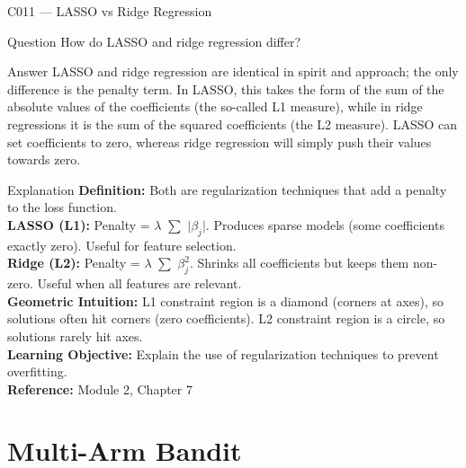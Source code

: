 \documentclass[aspectratio=169,8pt]{beamer}
\begin{document}
	\begin{frame}{C011 --- LASSO vs Ridge Regression}
		\begin{block}{Question}
			How do LASSO and ridge regression differ?
		\end{block}
		\begin{block}{Answer}
			LASSO and ridge regression are identical in spirit and approach; the only difference is the penalty term. In LASSO, this takes the form of the sum of the absolute values of the coefficients (the so-called L1 measure), while in ridge regressions it is the sum of the squared coefficients (the L2 measure). LASSO can set coefficients to zero, whereas ridge regression will simply push their values towards zero.
		\end{block}
		\begin{block}{Explanation}
			\textbf{Definition:} Both are regularization techniques that add a penalty to the loss function.\\
			\textbf{LASSO (L1):} Penalty = $\lambda$ $\sum$ $|$$\beta_j$$|$. Produces sparse models (some coefficients exactly zero). Useful for feature selection.\\
			\textbf{Ridge (L2):} Penalty = $\lambda$ $\sum$ $\beta_j^2$. Shrinks all coefficients but keeps them non-zero. Useful when all features are relevant.\\
			\textbf{Geometric Intuition:} L1 constraint region is a diamond (corners at axes), so solutions often hit corners (zero coefficients). L2 constraint region is a circle, so solutions rarely hit axes.\\
			\textbf{Learning Objective:} Explain the use of regularization techniques to prevent overfitting.\\
			\textbf{Reference:} Module 2, Chapter 7
		\end{block}
	\end{frame}
	
	\section{Multi-Arm Bandit}
	
\end{document}
